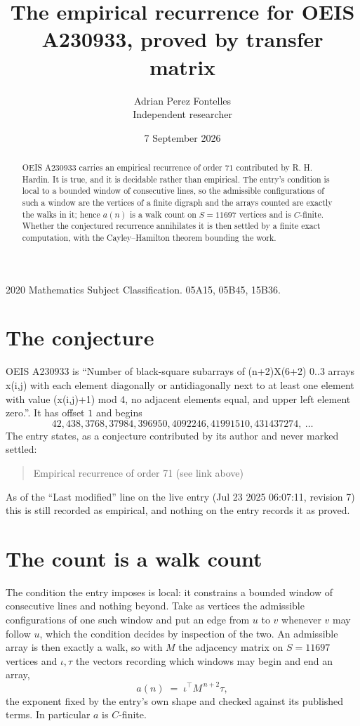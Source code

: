 \documentclass[11pt,a4paper]{article}
\title{The empirical recurrence for OEIS A230933, proved by transfer matrix}
\author{Adrian Perez Fontelles\\ \small Independent researcher}
\date{7 September 2026}
\theoremstyle{plain}
\theoremstyle{definition}
\begin{document}
\maketitle

\begin{abstract}
OEIS A230933 carries an empirical recurrence of order $71$ contributed by R. H. Hardin. It is
true, and it is decidable rather than empirical. The entry's condition is local to a bounded window of consecutive lines, so
the admissible configurations of such a window are the vertices of a finite digraph and the
arrays counted are exactly the walks in it; hence $a(n)$ is a walk count on $S=11697$ vertices
and is $C$-finite. Whether the conjectured recurrence annihilates it is then settled by a
finite exact computation, with the Cayley--Hamilton theorem bounding the work.
\end{abstract}

\noindent\small 2020 Mathematics Subject Classification. 05A15, 05B45, 15B36.\normalsize

\section{The conjecture}

OEIS A230933 is ``Number of black-square subarrays of (n+2)X(6+2) 0..3 arrays x(i,j) with each element diagonally or antidiagonally next to at least one element with value (x(i,j)+1) mod 4, no adjacent elements equal, and upper left element zero.''. It has offset $1$ and begins
\[
42, 438, 3768, 37984, 396950, 4092246, 41991510, 431437274,\ \dots
\]
The entry states, as a conjecture contributed by its author and never marked settled:
\begin{quote}
Empirical recurrence of order 71 (see link above)
\end{quote}
As of the ``Last modified'' line on the live entry (Jul 23 2025 06:07:11, revision 7) this is still
recorded as empirical, and nothing on the entry records it as proved.

\section{The count is a walk count}

The condition the entry imposes is local: it constrains a bounded window of consecutive lines and nothing beyond. Take as
vertices the admissible configurations of one such window and put an edge from $u$ to $v$
whenever $v$ may follow $u$, which the condition decides by inspection of the two. An
admissible array is then exactly a walk, so with $M$ the adjacency matrix on $S=11697$ vertices
and $\iota,\tau$ the vectors recording which windows may begin and end an array,
\[
a(n)\;=\;\iota^{\!\top}M^{\,n+2}\tau ,
\]
the exponent fixed by the entry's own shape and checked against its published terms. In
particular $a$ is $C$-finite.
\end{document}
